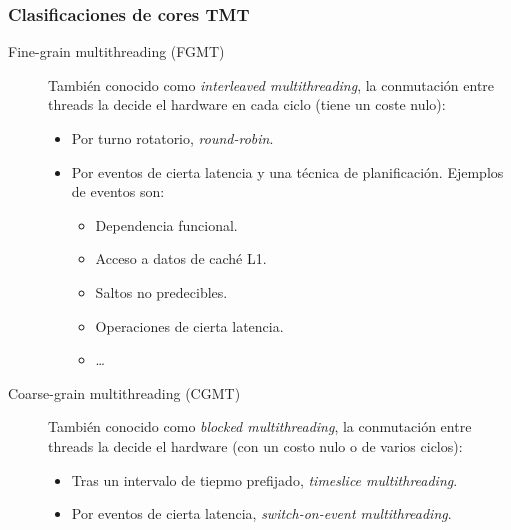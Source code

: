 \subsubsection{Clasificaciones de cores TMT}
\begin{description}
    \item [Fine-grain multithreading (FGMT)] También conocido como \emph{interleaved multithreading}, la conmutación entre threads la decide el hardware en cada ciclo (tiene un coste nulo):
        \begin{itemize}
            \item Por turno rotatorio, \emph{round-robin}.
            \item Por eventos de cierta latencia y una técnica de planificación. Ejemplos de eventos son:
                \begin{itemize}
                    \item Dependencia funcional.
                    \item Acceso a datos de caché L1.
                    \item Saltos no predecibles.
                    \item Operaciones de cierta latencia.
                    \item \ldots
                \end{itemize}
        \end{itemize}
    \item [Coarse-grain multithreading (CGMT)] También conocido como \emph{blocked multithreading}, la conmutación entre threads la decide el hardware (con un costo nulo o de varios ciclos):
        \begin{itemize}
            \item Tras un intervalo de tiepmo prefijado, \emph{timeslice multithreading}.
            \item Por eventos de cierta latencia, \emph{switch-on-event multithreading}.
        \end{itemize}
\end{description}

